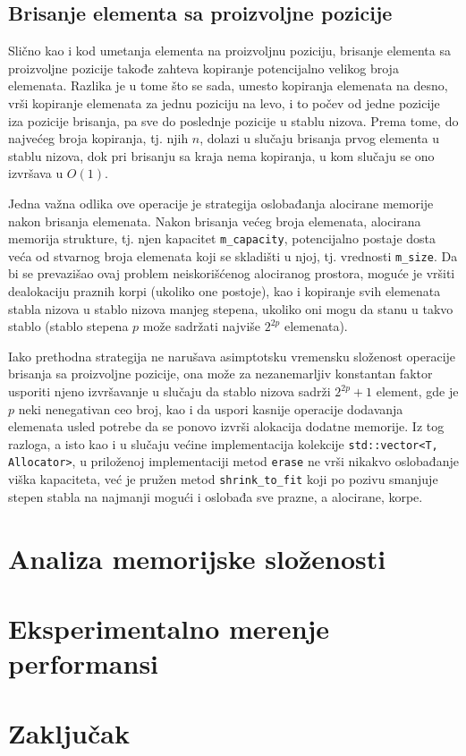 \documentclass[a4paper]{article}
\begin{document}
\subsection{Brisanje elementa sa proizvoljne pozicije}

Slično kao i kod umetanja elementa na proizvoljnu poziciju, brisanje elementa sa proizvoljne pozicije takođe zahteva kopiranje potencijalno velikog broja elemenata. Razlika je u tome što se sada, umesto kopiranja elemenata na desno, vrši kopiranje elemenata za jednu poziciju na levo, i to počev od jedne pozicije iza pozicije brisanja, pa sve do poslednje pozicije u stablu nizova. Prema tome, do najvećeg broja kopiranja, tj. njih $n$, dolazi u slučaju brisanja prvog elementa u stablu nizova, dok pri brisanju sa kraja nema kopiranja, u kom slučaju se ono izvršava u $O(1)$.

Jedna važna odlika ove operacije je strategija oslobađanja alocirane memorije nakon brisanja elemenata. Nakon brisanja većeg broja elemenata, alocirana memorija strukture, tj. njen kapacitet \verb|m_capacity|, potencijalno postaje dosta veća od stvarnog broja elemenata koji se skladišti u njoj, tj. vrednosti \verb|m_size|. Da bi se prevazišao ovaj problem neiskorišćenog alociranog prostora, moguće je vršiti dealokaciju praznih korpi (ukoliko one postoje), kao i kopiranje svih elemenata stabla nizova u stablo nizova manjeg stepena, ukoliko oni mogu da stanu u takvo stablo (stablo stepena $p$ može sadržati najviše $2^{2p}$ elemenata).

Iako prethodna strategija ne narušava asimptotsku vremensku složenost operacije brisanja sa proizvoljne pozicije, ona može za nezanemarljiv konstantan faktor usporiti njeno izvršavanje u slučaju da stablo nizova sadrži $2^{2p} + 1$ element, gde je $p$ neki nenegativan ceo broj, kao i da uspori kasnije operacije dodavanja elemenata usled potrebe da se ponovo izvrši alokacija dodatne memorije. Iz tog razloga, a isto kao i u slučaju većine implementacija kolekcije \verb|std::vector<T, Allocator>|, u priloženoj implementaciji metod \verb|erase| ne vrši nikakvo oslobađanje viška kapaciteta, već je pružen metod \verb|shrink_to_fit| koji po pozivu smanjuje stepen stabla na najmanji mogući i oslobađa sve prazne, a alocirane, korpe.

\section{Analiza memorijske složenosti}

\section{Eksperimentalno merenje performansi}

\section{Zaključak}

\appendix


\end{document}
